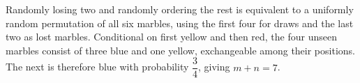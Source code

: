 Randomly losing two and randomly ordering the rest is equivalent to a uniformly random permutation of all six marbles, using the first four for draws and the last two as lost marbles. Conditional on first yellow and then red, the four unseen marbles consist of three blue and one yellow, exchangeable among their positions. The next is therefore blue with probability $\dfrac{3}{4}$, giving $\boxed{m+n=7}$.
